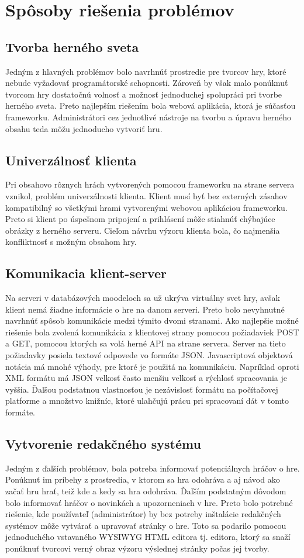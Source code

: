 \section{Spôsoby riešenia problémov}
\subsection{Tvorba herného sveta}
Jedným z hlavných problémov bolo navrhnúť prostredie pre tvorcov hry, ktoré nebude vyžadovať programátorské schopnosti. Zároveň by však malo ponúknuť tvorcom hry dostatočnú volnosť a možnosť jednoduchej spolupráci pri tvorbe herného sveta. Preto najlepším riešením bola webová aplikácia, ktorá je súčasťou frameworku. Administrátori cez jednotlivé nástroje na tvorbu a úpravu herného obsahu teda môžu jednoducho vytvoriť hru. 

\subsection{Univerzálnosť klienta}
Pri obsahovo rôznych hrách vytvorených pomocou frameworku na strane servera vznikol, problém univerzálnosti klienta. Klient musí byť bez externých zásahov kompatibilný so všetkými hrami vytvorenými webovou aplikáciou frameworku. Preto si klient po úspešnom pripojení a prihlásení môže stiahnúť chýbajúce obrázky z herného serveru. Cieľom návrhu výzoru klienta bola, čo najmenšia konfliktnosť s možným obsahom hry.

\subsection{Komunikacia klient-server}
Na serveri v databázových moodeloch sa už ukrýva virtuálny svet hry, avšak klient nemá žiadne informácie o hre na danom serveri. Preto bolo nevyhnutné navrhnúť spôsob komunikácie medzi týmito dvomi stranami. Ako najlepšie možné riešenie bola zvolená komunikácia z klientovej strany pomocou požiadaviek POST a GET, pomocou ktorých sa volá herné API na strane servera. Server na tieto požiadavky posiela textové odpovede vo formáte JSON. Javascriptová objektová notácia má mnohé výhody, pre ktoré je použitá na komunikáciu. Napríklad oproti XML formátu má JSON velkosť často menšiu velkosť a rýchlosť spracovania je vyššia. \cite{jsonVsXml} Ďaľšou podstatnou vlastnosťou je nezávislosť formátu na počítačovej platforme a množstvo knižníc, ktoré ulahčujú prácu pri spracovaní dát v tomto formáte.

\subsection{Vytvorenie redakčného systému}
Jedným z ďaľších problémov, bola potreba informovať potenciálnych hráčov o hre. Ponúknuť im príbehy z prostredia, v ktorom sa hra odohráva a aj návod ako začať hru hrať, teiž kde a kedy sa hra odohráva. Ďaľším podstatným dôvodom bolo informovať hráčov o novinkách a upozorneniach v hre. Preto bolo potrebné riešenie, kde používateľ (administrátor) by bez potreby inštalácie redakčných systémov môže vytvárať a upravovať stránky o hre. Toto sa podarilo pomocou jednoduchého vstavaného WYSIWYG HTML editora  tj. editora, ktorý sa snaží ponúknuť tvorcovi verný obraz výzoru výslednej stránky počas jej tvorby.

